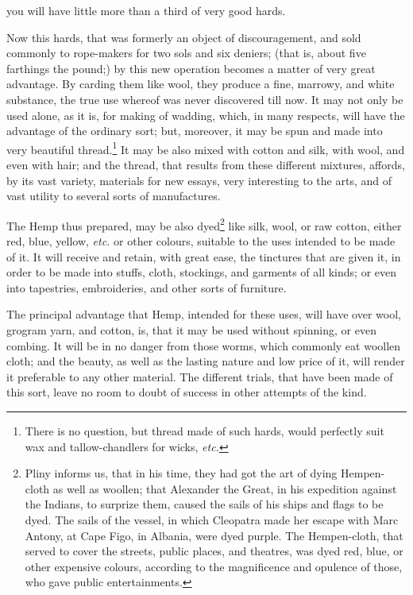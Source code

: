 \documentclass[a4paper, 11pt, oneside, polutonikogreek, english]{article}
\begin{document}
you will have little more than a third of very good hards.

Now this hards, that was formerly an object of discouragement, and sold commonly to rope-makers for two sols and six deniers; (that is, about five farthings the pound;) by this new operation becomes a matter of very great advantage. By carding them like wool, they produce a fine, marrowy, and white substance, the true use whereof was never discovered till now. It may not only be used alone, as it is, for making of wadding, which, in many respects, will have the advantage of the ordinary sort; but, moreover, it may be spun and made into very beautiful thread.\footnote{There is no question, but thread made of such hards, would perfectly suit wax and tallow-chandlers for wicks, \emph{etc.}} It may be also mixed with cotton and silk, with wool, and even with hair; and the thread, that results from these different mixtures, affords, by its vast variety, materials for new essays, very interesting to the arts, and of vast utility to several sorts of manufactures.

The Hemp thus prepared, may be also dyed\footnote{Pliny informs us, that in his time, they had got the art of dying Hempen-cloth as well as woollen; that Alexander the Great, in his expedition against the Indians, to surprize them, caused the sails of his ships and flags to be dyed. The sails of the vessel, in which Cleopatra made her escape with Marc Antony, at Cape Figo, in Albania, were dyed purple. The Hempen-cloth, that served to cover the streets, public places, and theatres, was dyed red, blue, or other expensive colours, according to the magnificence and opulence of those, who gave public entertainments.} like silk, wool, or raw cotton, either red, blue, yellow, \emph{etc.} or other colours, suitable to the uses intended to be made of it. It will receive and retain, with great ease, the tinctures that are given it, in order to be made into stuffs, cloth, stockings, and garments of all kinds; or even into tapestries, embroideries, and other sorts of furniture.

The principal advantage that Hemp, intended for these uses, will have over wool, grogram yarn, and cotton, is, that it may be used without spinning, or even combing. It will be in no danger from those worms, which commonly eat woollen cloth; and the beauty, as well as the lasting nature and low price of it, will render it preferable to any other material. The different trials, that have been made of this sort, leave no room to doubt of success in other attempts of the kind.
\end{document}
